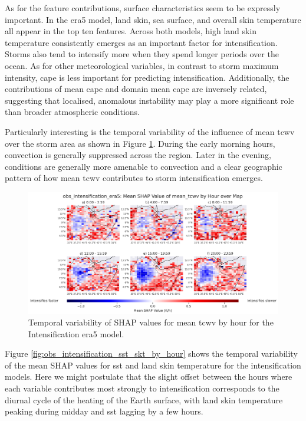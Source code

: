 As for the feature contributions, surface characteristics seem to be expressly important. In the \acrshort{era5} model, land skin, sea surface, and overall skin temperature all appear in the top ten features. Across both models, high land skin temperature consistently emerges as an important factor for intensification. Storms also tend to intensify more when they spend longer periods over the ocean. As for other meteorological variables, in contrast to storm maximum intensity, \acrshort{cape} is less important for predicting intensification. Additionally, the contributions of mean \acrshort{cape} and domain mean \acrshort{cape} are inversely related, suggesting that localised, anomalous instability may play a more significant role than broader atmospheric conditions.

Particularly interesting is the temporal variability of the influence of mean \acrshort{tcwv} over the storm area as shown in Figure \ref{fig:obs_intensification_era5_shap_mean_tcwv_map_by_hour}. During the early morning hours, convection is generally suppressed across the region. Later in the evening, conditions are generally more amenable to convection and a clear geographic pattern of how mean \acrshort{tcwv} contributes to storm intensification emerges. 

\begin{figure}[ht]
    \centering
    \includegraphics[width=\textwidth]{../figures/generated/experiments/obs_intensification/geographic_corr/obs_intensification_era5_shap_mean_tcwv_map_by_hour.png}
    \caption{Temporal variability of SHAP values for mean \acrshort{tcwv} by hour for the Intensification \acrshort{era5} model.}
    \label{fig:obs_intensification_era5_shap_mean_tcwv_map_by_hour}
\end{figure}

Figure \ref{fig:obs_intensification_sst_skt_by_hour} shows the temporal variability of the mean SHAP values for \acrfull{sst} and land skin temperature for the intensification models. Here we might postulate that the slight offset between the hours where each variable contributes most strongly to intensification corresponds to the diurnal cycle of the heating of the Earth surface, with land skin temperature peaking during midday and \acrshort{sst} lagging by a few hours.

